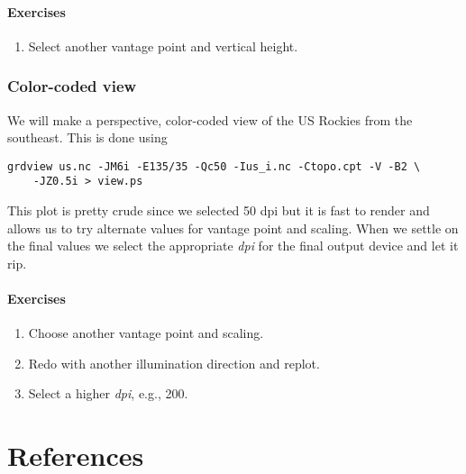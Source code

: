 \documentclass{report}
\begin{document}
\subsubsection{Exercises}

\begin{enumerate}

\item Select another vantage point and vertical height.

\end{enumerate}

\subsection{Color-coded view}

We will make a perspective, color-coded view of the US Rockies
from the southeast.  This is done using

{\small\begin{verbatim}
grdview us.nc -JM6i -E135/35 -Qc50 -Ius_i.nc -Ctopo.cpt -V -B2 \
    -JZ0.5i > view.ps
\end{verbatim}
}

\noindent
This plot is pretty crude since we selected 50 dpi but it is fast
to render and allows us to try alternate values for vantage point
and scaling.  When we settle on the final values we select the
appropriate \emph{dpi} for the final output device and let it rip.

\subsubsection{Exercises}

\begin{enumerate}

\item Choose another vantage point and scaling.

\item Redo  with another illumination direction and replot.

\item Select a higher \emph{dpi}, e.g., 200.

\end{enumerate}

\chapter{References} 
\thispagestyle{headings}
\end{document}
